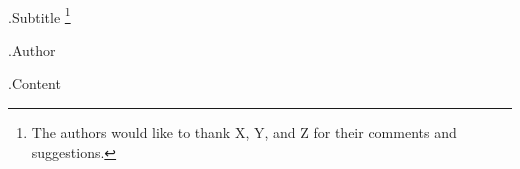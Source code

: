 \documentclass[10pt,article,a4paper,oneside]{memoir}
\begin{document}
\begingroup
\center
\vspace*{2\baselineskip}
{\textcolor{darkgray}{\fontsize{29.87pt}{39.82pt}}}\\[\baselineskip]
{\huge {{.Subtitle}} \footnote{The authors would like to thank X, Y, and Z for their comments and suggestions.}}\\[\baselineskip]
\par
\vspace*{2\baselineskip}
{\Large {{.Author}}}\\
\endgroup

\thispagestyle{empty}

\newpage
\tableofcontents
\newpage

{{.Content}}

\end{document}
